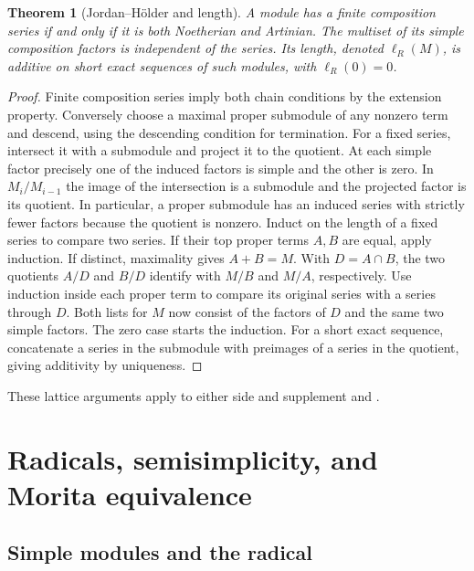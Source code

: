 \documentclass[11pt,oneside,openany]{book}
\newtheorem{theorem}{Theorem}[chapter]
\theoremstyle{definition}
\theoremstyle{remark}
\begin{document}
\begin{theorem}[Jordan--H\"older and length]\label{p103:ALG-03-C03-S01}
A module has a finite composition series if and only if it is both
Noetherian and Artinian. The multiset of its simple composition
factors is independent of the series. Its length, denoted
\(\ell_R(M)\), is additive on short exact sequences of such
modules, with \(\ell_R(0)=0\).
\end{theorem}
\begin{proof}
Finite composition series imply both chain conditions by the
extension property. Conversely choose a maximal proper submodule
of any nonzero term and descend, using the descending condition
for termination. For a fixed series, intersect it with a submodule
and project it to the quotient. At each simple factor precisely
one of the induced factors is simple and the other is zero.
In \(M_i/M_{i-1}\) the image of the intersection is a submodule
and the projected factor is its quotient. In particular, a proper
submodule has an induced series with strictly fewer factors
because the quotient is nonzero. Induct on the length of a
fixed series to compare two series. If their top proper terms
\(A,B\) are equal, apply induction. If distinct, maximality gives
\(A+B=M\). With \(D=A\cap B\), the two quotients \(A/D\) and
\(B/D\) identify with \(M/B\) and \(M/A\), respectively.
Use induction inside each proper term to compare its original
series with a series through \(D\). Both lists for \(M\) now
consist of the factors of \(D\) and the same two simple factors.
The zero case starts the induction. For a short exact sequence,
concatenate a series in the submodule with preimages of a series
in the quotient, giving additivity by uniqueness.
\end{proof}
These lattice arguments apply to either side and supplement
\cite[Notes to the Reader]{lam} and \cite[Section 18.1]{dummit}.
\chapter[Radicals, semisimplicity, and Morita equivalence]
{Radicals, semisimplicity, and Morita equivalence}
\label{p103:ch03}

\section{Simple modules and the radical}
\end{document}
